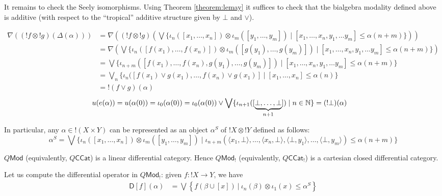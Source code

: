 It remains to check the Seely isomorphisms.
Using Theorem \ref{theorem:lemay} it suffices to check that the bialgebra modality defined above is additive (with respect to the ``tropical'' additive structure given by $\bot$ and $\vee$).

{\tiny
\begin{align*}
\nabla((!f\otimes !g)(\Delta(\alpha))) & =
\nabla\left((!f\otimes !g)\left(
\bigvee\{\iota_{n}([x_{1},\dots, x_{n}])\otimes \iota_{m}([y_{1},\dots, y_{m}])\mid [x_{1},\dots, x_{n},y_{1},\dots y_{m}]\leq \alpha(n+m)\}
\right)\right)\\
&=
\nabla\left(
\bigvee\{\iota_{n}([f(x_{1}),\dots, f(x_{n})])\otimes \iota_{m}([g(y_{1}),\dots, g(y_{m})])\mid [x_{1},\dots, x_{n},y_{1},\dots y_{m}]\leq \alpha(n+m)\}
\right)\\
&=
\bigvee\{\iota_{n+m}([f(x_{1}),\dots, f(x_{n}),g(y_{1}),\dots, g(y_{m})])\mid [x_{1},\dots, x_{n},y_{1},\dots y_{m}]\leq \alpha(n+m)\}\\
&=
\bigvee_{n}\{ \iota_{n}([f(x_{1})\vee g(x_{1}),\dots, f(x_{n})\vee g(x_{1})]
\mid [x_{1},\dots, x_{n}]\leq \alpha(n)\}\\
&=
!(f\vee g)(\alpha)
\end{align*}
}
\begin{align*}
u(e(\alpha)) = u(\alpha(0))& =\iota_{0}(\alpha({0})) =
\iota_{0}(\alpha(0))\vee
\bigvee\{\iota_{n+1}([\underbrace{\bot,\dots, \bot}_{n+1}])\mid n\in \mathbb{N} \}=
(!\bot) (\alpha)
\end{align*}

In particular, any $\alpha\in !(X\times Y)$ can be represented 
as an object $\alpha^{S}$ of $!X\otimes !Y$ defined as follows:
$$
\alpha^{S}=\bigvee \{ \iota_{n}([x_{1},\dots, x_{n}])\otimes \iota_{m}([y_{1},\dots, y_{m}]) \mid
\iota_{n+m}(\langle x_{1},\bot\rangle,\dots, 
\langle x_{n},\bot\rangle,
\langle \bot, y_{1}\rangle, \dots,
\langle \bot, y_{m}\rangle) \leq \alpha(n+m)
\}
$$


\begin{theorem}
$Q\mathsf{Mod}$ (equivalently, $Q\mathsf{CCat}$) is a linear differential category. Hence $Q\mathsf{Mod}_{!}$ (equivalently, $Q\mathsf{CCat}_{!}$) is a cartesian closed differential category. 
\end{theorem}

Let us compute the differential operator in $Q\mathsf{Mod}_{!}$: 
given $f:!X \to Y$, we have
\begin{align*}
\mathsf{D}[f](\alpha) & = 
\bigvee 
\left \{
f(\beta\cup[x])
\ \Big \vert \ 
\iota_{n}(\beta)\otimes \iota_{1}(x) \leq \alpha^{S}
\right\}
\end{align*}

